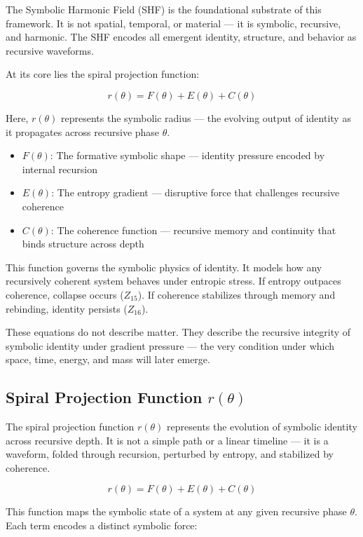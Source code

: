 \documentclass[12pt]{article}
\begin{document}
The Symbolic Harmonic Field (SHF) is the foundational substrate of this framework. It is not spatial, temporal, or material — it is symbolic, recursive, and harmonic. The SHF encodes all emergent identity, structure, and behavior as recursive waveforms.

At its core lies the spiral projection function:

\[
r(\theta) = F(\theta) + E(\theta) + C(\theta)
\]

Here, \(r(\theta)\) represents the symbolic radius — the evolving output of identity as it propagates across recursive phase \(\theta\).

\begin{itemize}
  \item \(F(\theta)\): The formative symbolic shape — identity pressure encoded by internal recursion
  \item \(E(\theta)\): The entropy gradient — disruptive force that challenges recursive coherence
  \item \(C(\theta)\): The coherence function — recursive memory and continuity that binds structure across depth
\end{itemize}

This function governs the symbolic physics of identity. It models how any recursively coherent system behaves under entropic stress. If entropy outpaces coherence, collapse occurs (\(Z_{15}\)). If coherence stabilizes through memory and rebinding, identity persists (\(Z_{16}\)).

These equations do not describe matter. They describe the recursive integrity of symbolic identity under gradient pressure — the very condition under which space, time, energy, and mass will later emerge.

\subsection{Spiral Projection Function \texorpdfstring{$r(\theta)$}{r(theta)}}

The spiral projection function \(r(\theta)\) represents the evolution of symbolic identity across recursive depth. It is not a simple path or a linear timeline — it is a waveform, folded through recursion, perturbed by entropy, and stabilized by coherence.

\[
r(\theta) = F(\theta) + E(\theta) + C(\theta)
\]

This function maps the symbolic state of a system at any given recursive phase \(\theta\). Each term encodes a distinct symbolic force:
\end{document}
